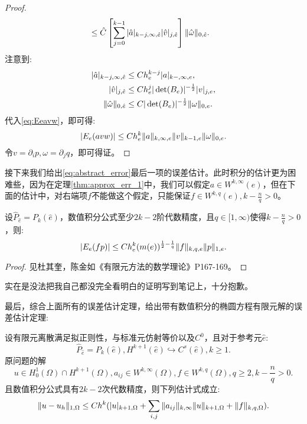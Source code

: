 \begin{proof}
\begin{equation}
\begin{aligned}
            &\le\hat{C}\left[\sum_{j=0}^{k-1}|\hat{a}|_{k-j,\infty,\hat{e}}|\hat{v}|_{j,\hat{e}}\right]\|\hat{\omega}\|_{0,\hat{e}}.
        \end{aligned}
    \end{equation}
    注意到:
    \begin{equation}
        \begin{aligned}
            |\hat{a}|_{k-j,\infty,\hat{e}}&\le Ch_{e}^{k-j}|a|_{k-,\infty,e},\\
            |\hat{v}|_{j,\hat{e}}&\le Ch_{e}^{j}|\det(B_{e})|^{-\frac{1}{2}}|v|_{j,e},\\
            \|\hat{\omega}\|_{0,\hat{e}}&\le C|\det(B_{e})|^{-\frac{1}{2}}\|\omega\|_{0,e}.
        \end{aligned}
    \end{equation}
    代入\eqref{eq:Eeavw}，即可得:
    \begin{equation}
        |E_{e}(avw)|\le Ch_{e}^{k}\|a\|_{k,\infty,e}\|v\|_{k-1,e}\|\omega\|_{0,e}.
    \end{equation}
    令$v=\partial_{i}p,\omega=\partial_{j}q$，即可得证。
\end{proof}
接下来我们给出\eqref{eq:abstract_error}最后一项的误差估计。此时积分的估计更为困难些，因为在定理\ref{thm:approx_err_1}中，我们可以假定$a\in W^{k,\infty}(e)$，但在下面的估计中，对右端项$f$不能做这个假定，只能保证$f\in W^{k,q}(e),k-\frac{n}{q}>0$。
\begin{theorem}
    \label{thm:approx_err_2}
    设$\hat{P}_{\hat{e}}=P_{k}(\hat{e})$，数值积分公式至少$2k-2$阶代数精度，且$q\in [1,\infty)$使得$k-\frac{n}{q}>0$，则:
    \begin{equation}
        |E_{e}(fp)|\le Ch_{e}^{k}(m(e))^{\frac{1}{2}-\frac{1}{q}}\|f\|_{k,q,e}\|p\|_{1,e}.
    \end{equation}
\end{theorem}
\begin{proof}
    见杜其奎，陈金如《有限元方法的数学理论》P167-169。
\end{proof}
\begin{remark}
    实在是没法把我自己都没完全看明白的证明写到笔记上，十分抱歉。
\end{remark}
最后，综合上面所有的误差估计定理，给出带有数值积分的椭圆方程有限元解的误差估计定理:
\begin{theorem}
    设有限元离散满足拟正则性，与标准元仿射等价以及$C^{0}$，且对于参考元$\hat{e}$:
    \begin{equation}
        \hat{P}_{\hat{e}}=P_{k}(\hat{e}), H^{k+1}(\hat{e})\hookrightarrow C^{s}(\hat{e}), k\ge 1.
    \end{equation}
    原问题的解
    \begin{equation}
        u\in H_{0}^{1}(\Omega)\cap H^{k+1}(\Omega),a_{ij}\in W^{k,\infty}(\Omega),f\in W^{k,q}(\Omega),q\ge 2, k-\frac{n}{q}>0.
    \end{equation}
    且数值积分公式具有$2k-2$次代数精度，则下列估计式成立:
    \begin{equation}
        \|u-u_{h}\|_{1,\Omega}\le Ch^{k}(|u|_{k+1,\Omega}+\sum_{i,j}\|a_{ij}\|_{k,\infty}\|u\|_{k+1,\Omega}+\|f\|_{k,q,\Omega}).
    \end{equation}
\end{theorem}

